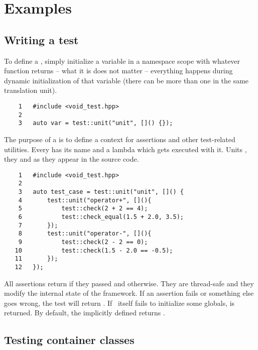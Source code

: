 \section{Examples}

\subsection{Writing a test}

To define a , simply initialize a variable in a namespace scope with whatever
 function returns -- what it is does not matter -- everything happens during
dynamic initialization of that variable (there can be more than one in the same translation unit).
\begin{verbatim}
    1   #include <void_test.hpp>
    2
    3   auto var = test::unit("unit", []() {});
\end{verbatim}
The purpose of a  is to define a context for assertions and other test-related
utilities. Every  has its name and a lambda which gets executed with it. Units
, they  and
 as they appear in the source code.
\begin{verbatim}
    1   #include <void_test.hpp>
    2
    3   auto test_case = test::unit("unit", []() {
    4       test::unit("operator+", [](){
    5           test::check(2 + 2 == 4);
    6           test::check_equal(1.5 + 2.0, 3.5);
    7       });
    8       test::unit("operator-", [](){
    9           test::check(2 - 2 == 0);
   10           test::check(1.5 - 2.0 == -0.5);
   11       });
   12   });
\end{verbatim}
All assertions return  if they passed and  otherwise. They are 
thread-safe and they modify the internal state of the framework. If an assertion fails or something
else goes wrong, the test will return . If \voidtest\ itself fails to initialize some
globals,  is returned. By default, the implicitly defined  returns .

\subsection{Testing container classes}

